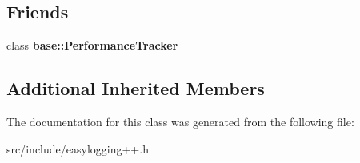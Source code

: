 \subsection*{Friends}
\begin{DoxyCompactItemize}
\item 
\mbox{\label{classel_1_1_performance_tracking_callback_a05f271f9cc2531409fe682c6ce0d9feb}} 
class {\bfseries base\+::\+Performance\+Tracker}
\end{DoxyCompactItemize}
\subsection*{Additional Inherited Members}


The documentation for this class was generated from the following file\+:\begin{DoxyCompactItemize}
\item 
src/include/easylogging++.\+h\end{DoxyCompactItemize}
